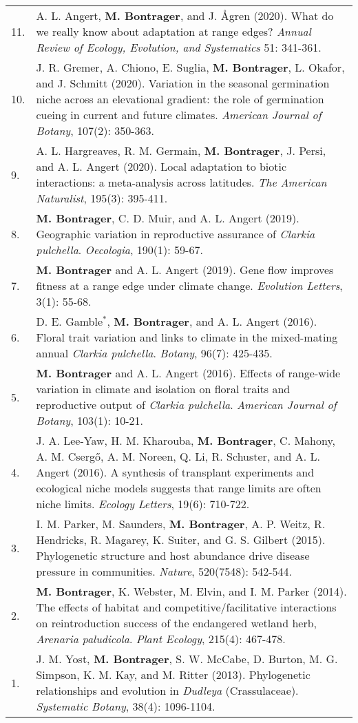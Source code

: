 \documentclass[letterpaper,11pt,oneside]{article}
\begin{document}
\def\arraystretch{1.4}
\noindent \begin{tabular}{@{} p{0.5cm} >{\raggedright\arraybackslash}p{16.7cm}}
11. & A. L. Angert, \textbf{M. Bontrager}, and J. \AA gren (2020). What do we really know about adaptation at range edges? \textit{Annual Review of Ecology, Evolution, and Systematics} 51: 341-361. \\
10. & J. R. Gremer, A. Chiono, E. Suglia, \textbf{M. Bontrager}, L. Okafor, and J. Schmitt (2020). Variation in the seasonal germination niche across an elevational gradient: the role of germination cueing in current and future climates. \textit{American Journal of Botany}, 107(2): 350-363. \\
9. & A. L. Hargreaves, R. M. Germain, \textbf{M. Bontrager}, J. Persi, and A. L. Angert (2020). Local adaptation to biotic interactions: a meta-analysis across latitudes. \textit{The American Naturalist}, 195(3): 395-411. \\
8. & \textbf{M. Bontrager}, C. D. Muir, and A. L. Angert (2019). Geographic variation in reproductive assurance of \textit{Clarkia pulchella}. \textit{Oecologia}, 190(1): 59-67. \\
7. & \textbf{M. Bontrager} and A. L. Angert (2019). Gene flow improves fitness at a range edge under climate change. \textit{Evolution Letters}, 3(1): 55-68. \\
6. & D. E. Gamble$^{*}$, \textbf{M. Bontrager}, and A. L. Angert (2016). Floral trait variation and links to climate in the mixed-mating annual \textit{Clarkia pulchella}. \textit{Botany}, 96(7): 425-435. \\
5. & \textbf{M. Bontrager} and A. L. Angert (2016). Effects of range-wide variation in climate and isolation on floral traits and reproductive output of \textit{Clarkia pulchella}. \textit{American Journal of Botany}, 103(1): 10-21.  \\
4. & J. A. Lee-Yaw, H. M. Kharouba, \textbf{M. Bontrager}, C. Mahony, A. M. Cserg{\H{o}}, A. M. Noreen, Q. Li, R. Schuster, and A. L. Angert (2016). A synthesis of transplant experiments and ecological niche models suggests that range limits are often niche limits. \textit{Ecology Letters}, 19(6): 710-722. \\
3. & I. M. Parker, M. Saunders, \textbf{M. Bontrager}, A. P. Weitz, R. Hendricks, R. Magarey, K. Suiter, and G. S. Gilbert (2015). Phylogenetic structure and host abundance drive disease pressure in communities. \textit{Nature}, 520(7548): 542-544. \\
2. & \textbf{M. Bontrager}, K. Webster, M. Elvin, and I. M. Parker (2014). The effects of habitat and competitive/facilitative interactions on reintroduction success of the endangered wetland herb, \textit{Arenaria paludicola}. \textit{Plant Ecology}, 215(4): 467-478. \\
1. & J. M. Yost, \textbf{M. Bontrager}, S. W. McCabe, D. Burton, M. G. Simpson, K. M. Kay, and M. Ritter (2013). Phylogenetic relationships and evolution in \textit{Dudleya} (Crassulaceae). \textit{Systematic Botany}, 38(4): 1096-1104. \\
\end{tabular}
\end{document}
